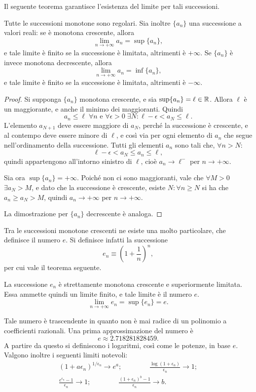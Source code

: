 Il seguente teorema garantisce l'esistenza del limite per tali successioni.
\begin{teorema}
Tutte le successioni monotone sono regolari. Sia inoltre $\{a_n\}$ una successione a valori reali: se è monotona crescente, allora
\[
\lim_{n\to +\infty} a_n=\sup\{a_n\},
\]
e tale limite è finito se la successione è limitata, altrimenti è $+\infty$.
Se $\{a_n\}$ è invece monotona decrescente, allora
\[
\lim_{n\to +\infty} a_n=\inf\{a_n\},
\]
e tale limite è finito se la successione è limitata, altrimenti è $-\infty$.
\end{teorema}
\begin{proof}
Si supponga $\{a_n\}$ monotona crescente, e sia $\sup\{a_n\}=\ell\in\mathbb{R}$. Allora $\ell$ è un maggiorante, e anche il minimo dei maggioranti. Quindi
\[
a_n\leq\ell\;\forall n\text{ e }\forall\epsilon>0\;\exists N\colon\ell-\epsilon<a_N\leq\ell.
\]
L'elemento $a_{N+1}$ deve essere maggiore di $a_N$, perché la successione è crescente, e al contempo deve essere minore di $\ell$, e così via per ogni elemento di $a_n$ che segue nell'ordinamento della successione. Tutti gli elementi $a_n$ sono tali che, $\forall n>N$:
\[
\ell-\epsilon<a_N\leq a_n\leq\ell,
\]
quindi appartengono all'intorno sinistro di $\ell$, cioè $a_n\to\ell^-$ per $n\to +\infty$.

Sia ora $\sup\{a_n\}=+\infty$. Poiché non ci sono maggioranti, vale che $\forall M>0$ $\exists a_N>M$, e dato che la successione è crescente, esiste $N\colon\forall n\geq N$ si ha che $a_n\geq a_N>M$, quindi $a_n\to +\infty$ per $n\to +\infty$.

La dimostrazione per $\{a_n\}$ decrescente è analoga.
\end{proof}
Tra le successioni monotone crescenti ne esiste una molto particolare, che definisce il numero $e$. Si definisce infatti la successione
\[
e_n\equiv\left(1+\frac1{n}\right)^n,
\]
per cui vale il teorema seguente.
\begin{teorema}
La successione $e_n$ è strettamente monotona crescente e superiormente limitata. Essa ammette quindi un limite finito, e tale limite è il numero $e$.
\[
\lim_{n\to +\infty} e_n=\sup\{e_n\}=e.
\]
\end{teorema}
Tale numero è trascendente in quanto non è mai radice di un polinomio a coefficienti razionali. Una prima approssimazione del numero è
\[
e\approx\num{2.718281828459}.
\]
A partire da questo si definiscono i logaritmi, così come le potenze, in base $e$. Valgono inoltre i seguenti limiti notevoli:
\begin{gather*}
(1+a\epsilon_n)^{1/\epsilon_n}\to e^a;\qquad\qquad\frac{\log(1+\epsilon_n)}{\epsilon_n}\to 1;\\
\frac{e^{\epsilon_n}-1}{\epsilon_n}\to 1;\qquad\qquad\frac{(1+\epsilon_n)^b-1}{\epsilon_n}\to b.
\end{gather*}
